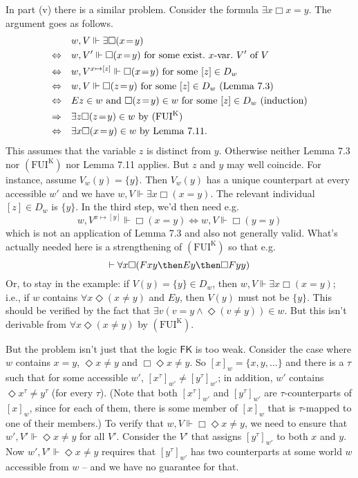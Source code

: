 \documentclass[11pt]{woarticle}
\theoremstyle{break}
\theoremstyle{nonumberplain}
\newcommand{\s}[1]{\ensuremath{\mathsf{#1}}}
\newcommand{\SAT}{\Vdash}
\newcommand{\1}{\;\,|\;\,}
\newcommand{\T}[1]{\ensuremath{(\mathrm{ #1})}}
\begin{document}
{\begin{enumerate}
  In part (v) there is a similar problem. Consider the formula
  $\exists x \Box x\!=\!y$. The argument goes as follows.
  \begin{align*}
      & w,V  \SAT \exists \Box(x\!=\!y)\\
   \Leftrightarrow\quad &  w,V' \SAT \Box(x\!=\!y) \text{ for some exist.\ $x$-var.\ $V'$ of $V$}\\
   \Leftrightarrow\quad &  w,V^{x\mapsto[z]} \SAT \Box(x\!=\!y) \text{ for some $[z] \in D_w$}\\
   \Leftrightarrow\quad &  w,V \SAT \Box(z\!=\!y) \text{ for some $[z] \in D_w$ (Lemma 7.3)}\\
   \Leftrightarrow\quad &  Ez \in w \text{ and } \Box (z\!=\!y) \in w \text{ for some $[z] \in D_w$ (induction)}\\
   \Rightarrow\quad & \exists z \Box(z\!=\!y) \in w \text{ by \T{FUI^K}}\\
   \Leftrightarrow\quad &  \exists x \Box(x\!=\!y) \in w \text{ by Lemma 7.11}.
 \end{align*}
 This assumes that the variable $z$ is distinct from $y$. Otherwise
 neither Lemma 7.3 nor \T{FUI^K} nor Lemma 7.11 applies. But $z$ and
 $y$ may well coincide. For instance, assume $V_w(y) = \{ y \}$. Then
 $V_w(y)$ has a unique counterpart at every accessible $w'$ and we
 have $w,V \SAT \exists x \Box (x=y)$. The relevant individual $[z]
 \in D_w$ is $\{ y \}$.  In the third step, we'd then need e.g.\
 \[
 w,V^{x\mapsto [y]} \SAT \Box(x=y)  \Leftrightarrow  w,V \SAT \Box(y=y)
 \]
 which is not an application of Lemma 7.3 and also not generally
 valid. What's actually needed here is a strengthening of \T{FUI^K}
 so that e.g.\
 \[
 \vdash \forall x\Box (Fxy \then Ey \then \Box Fyy)
 \]
 Or, to stay in the example: if $V(y) = \{ y \} \in D_w$, then $w,V
 \SAT \exists x\Box (x=y)$; i.e., if $w$ contains $\forall x\Diamond(x
 \not= y)$ and $Ey$, then $V(y)$ must not be $\{ y \}$. This should be
 verified by the fact that $\exists v (v\!=\!y \land
 \Diamond(v\!\not=y)) \in w$. But this isn't derivable from $\forall x
 \Diamond (x\!\not=\!y)$ by \T{FUI^K}.

 But the problem isn't just that the logic \s{FK} is too
 weak. Consider the case where $w$ contains $x\!=\!y$, $\Diamond
 x\!\not=\!y$ and $\Box\Diamond x\!\not=\!y$. So $[x]_w =
 \{x,y,\ldots\}$ and there is a $\tau$ such that for some accessible
 $w'$, $[x^\tau]_{w'} \not= [y^\tau]_{w'}$; in addition, $w'$ contains
 $\Diamond x^\tau\!\not=\!y^\tau$ (for every $\tau$). (Note that both
 $[x^\tau]_{w'}$ and $[y^\tau]_{w'}$ are $\tau$-counterparts of
 $[x]_w$, since for each of them, there is some member of $[x]_w$ that
 is $\tau$-mapped to one of their members.) To verify that $w,V \SAT
 \Box\Diamond x\!\not=\!y$, we need to ensure that $w', V' \SAT
 \Diamond x\!\not=\!y$ for all $V'$. Consider the $V'$ that assigns
 $[y^\tau]_{w'}$ to both $x$ and $y$. Now $w', V' \SAT \Diamond
 x\!\not=\!y$ requires that $[y^\tau]_{w'}$ has two counterparts at
 some world $w$ accessible from $w$ -- and we have no guarantee for
 that.


\end{enumerate}}
\end{document}
